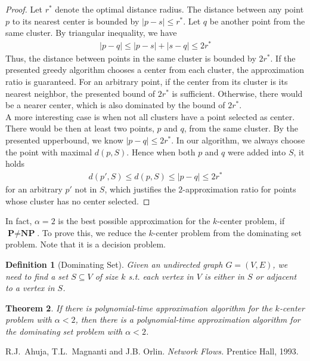 \documentclass[11pt,psfig,times]{article}
\newcommand*{\PTIME}{\textbf{P}}
\newcommand*{\NP}{\textbf{NP}}
\newtheorem{theorem}{Theorem}
\newtheorem{definition}[theorem]{Definition}
\begin{document}
\begin{proof}
    Let $r^*$ denote the optimal distance radius. 
    The distance between any point $p$ to its nearest center is bounded by $|p - s| \leq r^*$. 
    Let $q$ be another point from the same cluster. By triangular inequality, we have 
    \begin{align*}
        |p - q| \leq |p - s| + |s - q| \leq 2r^*    
    \end{align*}
    Thus, the distance between points in the same cluster is bounded by $2r^*$. If the presented greedy algorithm
    chooses a center from each cluster, the approximation ratio is guaranteed. For an arbitrary point, if the center from 
    its cluster is its nearest neighbor, the presented bound of $2r^*$ is sufficient. 
    Otherwise, there would be a nearer center, which is also dominated by the bound of $2r^*$.  \\
    A more interesting case is when not all clusters have a point selected as center. 
    There would be then at least two points, $p$ and $q$,  from the same cluster. By the presented upperbound, 
    we know $|p - q| \leq 2r^*$. In our algorithm, we always choose the point with maximal $d(p, S)$. Hence 
    when both $p$ and $q$ were added into $S$, it holds
    \begin{align*}
        d(p', S) \leq d(p, S) \leq |p - q| \leq 2r^*
    \end{align*} 
    for an arbitrary $p'$ not in $S$, which justifies the $2$-approximation ratio for points whose cluster has no center selected.
\end{proof}
In fact, $\alpha = 2$ is the best possible approximation for the $k$-center problem, if $\PTIME \neq \NP$. To prove this, 
we reduce the $k$-center problem from the dominating set problem. Note that it is a decision problem.
\begin{definition}[Dominating Set]
    Given an undirected graph $G = (V, E)$, we need to find a set $S \subseteq V$ of size $k$ s.t. each vertex in $V$ is either in $S$ or adjacent to a vertex in $S$.
\end{definition}
\begin{theorem}
    If there is polynomial-time approximation algorithm for the $k$-center problem with $\alpha < 2$, then there is a polynomial-time approximation algorithm for the dominating set problem with $\alpha < 2$.
\end{theorem}




\begin{thebibliography}{10}
\setlength{\itemsep}{0pt plus .3pt}
\setlength{\parsep}{0pt plus .3pt}
\setlength{\parskip}{0pt plus .3pt}

R.J.\ Ahuja, T.L.\ Magnanti and J.B. Orlin. {\em Network Flows.\/} Prentice Hall, 1993.

\end{thebibliography}
\end{document}
